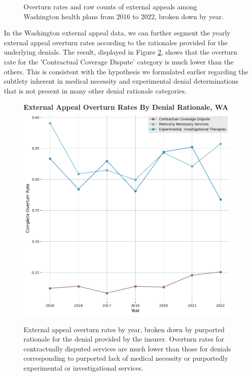 \documentclass[12pt, a4paper,twoside,parskip=full]{report}
\theoremstyle{plain} %
\theoremstyle{definition} %
\theoremstyle{remark} %
\numberwithin{equation}{chapter}
\begin{document}
\begin{figure}[h!]
\begin{subfigure}[b]{0.49\textwidth}
			\end{subfigure}
			\caption{Overturn rates and raw counts of external appeals among Washington health plans from 2016 to 2022, broken down by year.}
			\label{waexternalappealsovertime}
		\end{figure}
	
		\clearpage
	
		In the Washington external appeal data, we can further segment the yearly external appeal overturn rates according to the rationales provided for the underlying denials. The result, displayed in Figure \ref{waexternalappealsovertimebydenialrationale}, shows that the overturn rate for the 'Contractual Coverage Dispute' category is much lower than the others. This is consistent with the hypothesis we formulated earlier regarding the subtlety inherent in medical necessity and experimental denial determinations that is not present in many other denial rationale categories.
		
		\begin{figure}[h!]
			\centering
			\textbf{External Appeal Overturn Rates By Denial Rationale, WA}
			\includegraphics[width=.8\textwidth]{images/wa_external_appeals/external_appeal_overturn_rates_by_denial_rationale_by_year.png}
			\caption{External appeal overturn rates by year, broken down by purported rationale for the denial provided by the insurer. Overturn rates for contractually disputed services are much lower than those for denials corresponding to purported lack of medical necessity or purportedly experimental or investigational services.}
			\label{waexternalappealsovertimebydenialrationale}
		\end{figure}
		
\end{document}
